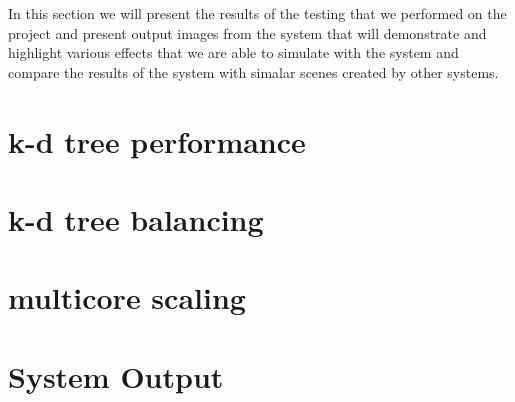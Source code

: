 In this section we will present the results of the testing that we performed on the project and
present output images from the system that will demonstrate and highlight various effects that
we are able to simulate with the system and compare the results of the system with simalar scenes
created by other systems.

\section{k-d tree performance}
\section{k-d tree balancing}
\missingfigure{}
\section{multicore scaling}

\section{System Output}


